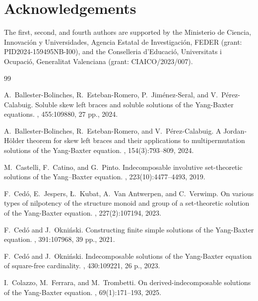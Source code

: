 \documentclass[12pt, a4paper, english]{article}
\theoremstyle{definition}
\theoremstyle{remark}
\newcounter{cond}
\begin{document}
\section*{Acknowledgements}
The first, second, and fourth authors are supported by the Ministerio de Ciencia, Innovación y Universidades, Agencia Estatal de Investigación, FEDER (grant: PID2024-159495NB-I00), and the Conselleria d'Educació, Universitats i Ocupació, Generalitat Valenciana (grant: \mbox{CIAICO/2023/007}).


\begin{thebibliography}{99}

A.~Ballester-Bolinches, R.~Esteban-Romero, P.~Jim{\'e}nez-Seral, and
  V.~P{\'e}rez-Calabuig.
\newblock Soluble skew left braces and soluble solutions of the {Y}ang-{B}axter
  equations.
, 455:109880, 27 pp., 2024.

A.~Ballester-Bolinches, R.~Esteban-Romero, and V.~P{\'e}rez-Calabuig.
\newblock A {J}ordan-{H}{\"o}lder theorem for skew left braces and their
  applications to multipermutation solutions of the {Y}ang-{B}axter equation.
, 154(3):793--809, 2024.

M.~Castelli, F.~Catino, and G.~Pinto.
\newblock Indecomposable involutive set-theoretic solutions of the
  {Y}ang–{B}axter equation.
, 223(10):4477--4493, 2019.

F.~Ced{\'o}, E.~Jespers, {\L}.~Kubat, A.~Van Antwerpen, and C.~Verwimp.
\newblock On various types of nilpotency of the structure monoid and group of a
  set-theoretic solution of the {Y}ang-{B}axter equation.
, 227(2):107194, 2023.

F.~Ced{\'o} and J.~Okni{\'n}ski.
\newblock Constructing finite simple solutions of the {Y}ang-{B}axter equation.
, 391:107968, 39 pp., 2021.

F.~Ced{\'o} and J.~Okni{\'n}ski.
\newblock Indecomposable solutions of the {Y}ang-{B}axter equation of
  square-free cardinality.
, 430:109221, 26 p., 2023.

I.~Colazzo, M.~Ferrara, and M.~Trombetti.
\newblock On derived-indecomposable solutions of the {Y}ang-{B}axter equation.
, 69(1):171--193, 2025.


\end{thebibliography}
\end{document}

